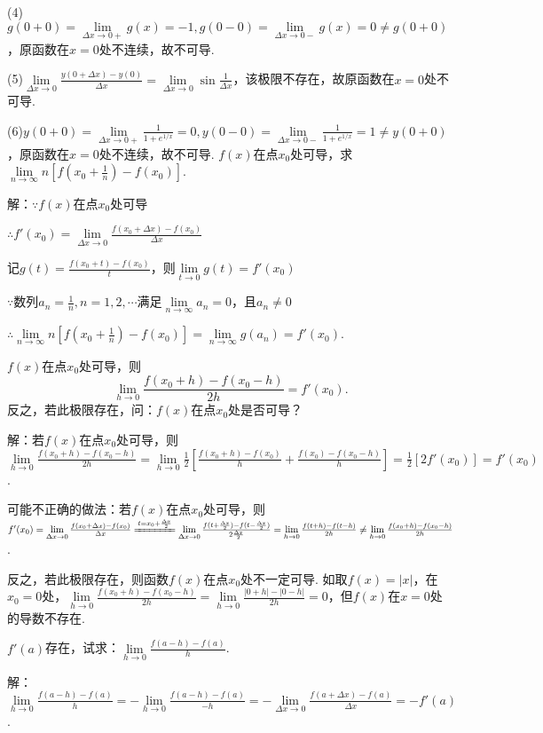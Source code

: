 \documentclass[12pt,UTF8]{ctexart}
\begin{document}
\begin{enumerate}
(4)$g(0+0)=\lim\limits_{\Delta x\rightarrow0+}g(x)=-1,g(0-0)=\lim\limits_{\Delta x\rightarrow0-}g(x)=0\neq g(0+0)$，原函数在$x=0$处不连续，故不可导.

(5)$\lim\limits_{\Delta x\rightarrow0}\frac{y(0+\Delta x)-y(0)}{\Delta x}=\lim\limits_{\Delta x\rightarrow0}\sin\frac1{\Delta x}$，该极限不存在，故原函数在$x=0$处不可导.

(6)$y(0+0)=\lim\limits_{\Delta x\rightarrow0+}\frac1{1+e^{1/x}}=0,y(0-0)=\lim\limits_{\Delta x\rightarrow0-}\frac1{1+e^{1/x}}=1\neq y(0+0)$，原函数在$x=0$处不连续，故不可导.
$f(x)$在点$x_0$处可导，求$\lim\limits_{n\rightarrow\infty}n[f(x_0+\frac1n)-f(x_0)]$.

解：$\because f(x)$在点$x_0$处可导

$\therefore f'(x_0)=\lim\limits_{\Delta x\rightarrow0}\frac{f(x_0+\Delta x)-f(x_0)}{\Delta x}$

记$g(t)=\frac{f(x_0+t)-f(x_0)}{t}$，则$\lim\limits_{t\rightarrow0}g(t)=f'(x_0)$

$\because$数列$a_n=\frac1n,n=1,2,\cdots$满足$\lim\limits_{n\rightarrow\infty}a_n=0$，且$a_n\neq0$

$\therefore\lim\limits_{n\rightarrow\infty}n[f(x_0+\frac1n)-f(x_0)]=\lim\limits_{n\rightarrow\infty}g(a_n)=f'(x_0)$.

$f(x)$在点$x_0$处可导，则
\[
\lim\limits_{h\rightarrow0}\frac{f(x_0+h)-f(x_0-h)}{2h}=f'(x_0).
\]
反之，若此极限存在，问：$f(x)$在点$x_0$处是否可导？

解：若$f(x)$在点$x_0$处可导，则$\lim\limits_{h\rightarrow0}\frac{f(x_0+h)-f(x_0-h)}{2h}=\lim\limits_{h\rightarrow0}\frac12[\frac{f(x_0+h)-f(x_0)}h+\frac{f(x_0)-f(x_0-h)}h]=\frac12[2f'(x_0)]=f'(x_0)$.

可能不正确的做法：若$f(x)$在点$x_0$处可导，则$f'(x_0)=\lim\limits_{\Delta x\rightarrow0}\frac{f(x_0+\Delta x)-f(x_0)}{\Delta x}\xlongequal{t=x_0+\frac{\Delta x}2}\lim\limits_{\Delta x\rightarrow0}\frac{f(t+\frac{\Delta x}2)-f(t-\frac{\Delta x}2)}{2\frac{\Delta x}2}=\lim\limits_{h\rightarrow0}\frac{f(t+h)-f(t-h)}{2h}\neq\lim\limits_{h\rightarrow0}\frac{f(x_0+h)-f(x_0-h)}{2h}$.

反之，若此极限存在，则函数$f(x)$在点$x_0$处不一定可导. 如取$f(x)=|x|$，在$x_0=0$处，$\lim\limits_{h\rightarrow0}\frac{f(x_0+h)-f(x_0-h)}{2h}=\lim\limits_{h\rightarrow0}\frac{|0+h|-|0-h|}{2h}=0$，但$f(x)$在$x=0$处的导数不存在.

$f'(a)$存在，试求：$\lim\limits_{h\rightarrow0}\frac{f(a-h)-f(a)}{h}$.

解：$\lim\limits_{h\rightarrow0}\frac{f(a-h)-f(a)}{h}=-\lim\limits_{h\rightarrow0}\frac{f(a-h)-f(a)}{-h}=-\lim\limits_{\Delta x\rightarrow0}\frac{f(a+\Delta x)-f(a)}{\Delta x}=-f'(a)$.


\end{enumerate}
\end{document}
